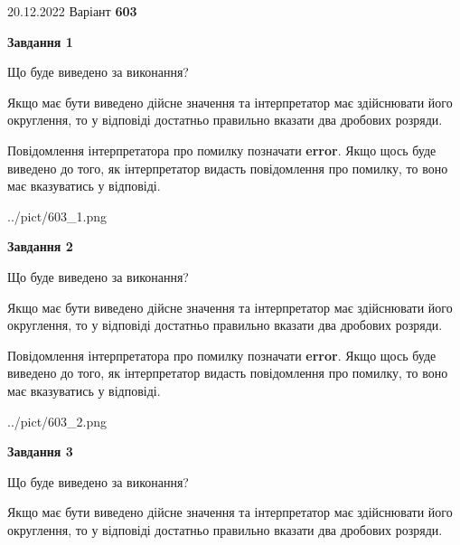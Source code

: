 \documentclass[12pt, ukrainian]{article}
\begin{document}
{20.12.2022 Варіант \No \textbf { 603 }\par}
{
\begin {Large}

{\begin {center}\textbf{Завдання 1}\end {center}}\par
Що буде виведено за виконання? \par

Якщо має бути виведено дійсне значення та інтерпретатор має здійснювати його округлення, 
то у відповіді достатньо правильно вказати два дробових розряди.

Повідомлення інтерпретатора про помилку позначати \textbf{error}.
Якщо щось буде виведено до того, як інтерпретатор видасть повідомлення про помилку, 
то воно має вказуватись у відповіді. \par

\begin{center}
	{../pict/603_1.png}
\end{center}
\newpage

{\begin {center}\textbf{Завдання 2}\end {center}}\par
Що буде виведено за виконання? \par

Якщо має бути виведено дійсне значення та інтерпретатор має здійснювати його округлення, 
то у відповіді достатньо правильно вказати два дробових розряди.

Повідомлення інтерпретатора про помилку позначати \textbf{error}.
Якщо щось буде виведено до того, як інтерпретатор видасть повідомлення про помилку, 
то воно має вказуватись у відповіді. \par

\begin{center}
	{../pict/603_2.png}
\end{center}
\newpage

{\begin {center}\textbf{Завдання 3}\end {center}}\par
Що буде виведено за виконання? \par

Якщо має бути виведено дійсне значення та інтерпретатор має здійснювати його округлення, 
то у відповіді достатньо правильно вказати два дробових розряди.


\end{Large}}
\end{document}
